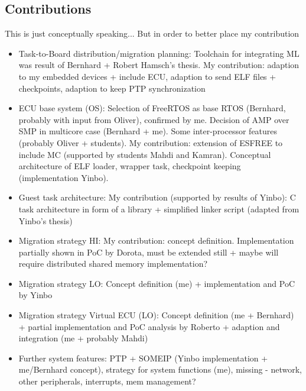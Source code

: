 %


\subsection{Contributions}
This is just conceptually speaking... But in order to better place my contribution

\begin{itemize}
	\item Task-to-Board distribution/migration planning: Toolchain for integrating ML was result of Bernhard + Robert Hamsch's thesis. My contribution: adaption to my embedded devices + include ECU, adaption to send ELF files + checkpoints, adaption to keep PTP synchronization
	\item ECU base system (OS): Selection of FreeRTOS as base RTOS (Bernhard, probably with input from Oliver), confirmed by me. Decision of AMP over SMP in multicore case (Bernhard + me). Some inter-processor features (probably Oliver + students). My contribution: extension of ESFREE to include MC (supported by students Mahdi and Kamran). Conceptual architecture of ELF loader, wrapper task, checkpoint keeping (implementation Yinbo).
	\item Guest task architecture: My contribution (supported by results of Yinbo): C task architecture in form of a library + simplified linker script (adapted from Yinbo's thesis)
	\item Migration strategy HI: My contribution: concept definition. Implementation partially shown in PoC by Dorota, must be extended still + maybe will require distributed shared memory implementation?
	\item Migration strategy LO: Concept definition (me) + implementation and PoC by Yinbo
	\item Migration strategy Virtual ECU (LO): Concept definition (me + Bernhard) + partial implementation and PoC analysis by Roberto + adaption and integration (me + probably Mahdi)
	\item Further system features: PTP + SOMEIP (Yinbo implementation + me/Bernhard concept), strategy for system functions (me), missing - network, other peripherals, interrupts, mem management? 
\end{itemize}


